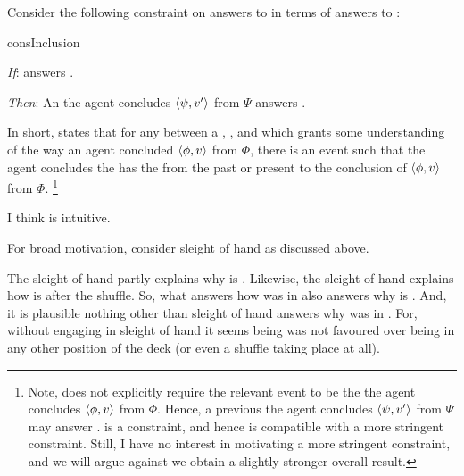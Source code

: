 \begin{note}
  Consider the following constraint on answers to \qWhy{} in terms of answers to \qHow{}:

  \begin{constraint}{consInclusion}{\issueInclusion{}}
    \mbox{ }
    \vspace{-\baselineskip}
    \begin{itenum}
    \item[\emph{If}:]
       answers \qWhy{}.
    \item[\emph{Then}:]
      An  the agent concludes \(\langle\psi, v'\rangle\) from \(\Psi\) answers \qHow{}.
    \end{itenum}
    \vspace{-\baselineskip}
  \end{constraint}

  \noindent%
  In short, \issueInclusion{} states that for any \fingfr{} between a , , and \pool{} which grants some understanding of the way an agent concluded \(\langle\phi, v\rangle\) from \(\Phi\), there is an event such that the agent concludes the \prop{} has the \val{} from the \pool{} past or present to the \agents{} conclusion of \(\langle\phi, v\rangle\) from \(\Phi\).%
  \footnote{
    Note, \qHow{} does not explicitly require the relevant event to be the  the agent concludes \(\langle\phi, v\rangle\) from \(\Phi\).
    Hence, a previous  the agent concludes \(\langle\psi, v'\rangle\) from \(\Psi\) may answer \qHow{}.
    \issueInclusion{} is a constraint, and hence is compatible with a more stringent constraint.
    Still, I have no interest in motivating a more stringent constraint, and we will argue against \issueInclusion{} we obtain a slightly stronger overall result.
  }
\end{note}


\begin{note}
  I think \issueInclusion{} is intuitive.
\end{note}


\begin{note}
  For broad motivation, consider sleight of hand as discussed above.

  The sleight of hand partly explains why \mainCard{} is \mainCardPos{}.
  Likewise, the sleight of hand explains how \mainCard{} is \mainCardPos{} after the shuffle.
  So, what answers how \mainCard{} was in \mainCardPos{} also answers why \mainCard{} is \mainCardPos{}.
  And, it is plausible nothing other than sleight of hand answers why \mainCard{} was in \mainCardPos{}.
  For, without engaging in sleight of hand it seems \mainCard{} being \mainCardPos{} was not favoured over \mainCard{} being in any other position of the deck (or even a shuffle taking place at all).
\end{note}


